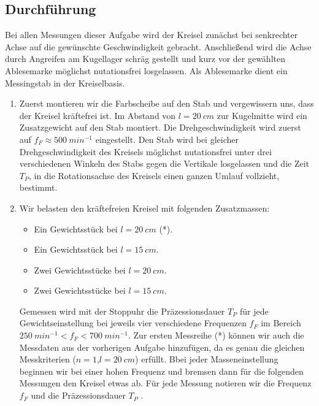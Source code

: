 \documentclass[a4paper,10pt]{article}
\begin{document}
\subsection[Durchführung]{Durchführung\fnrefb}
Bei allen Messungen dieser Aufgabe wird der Kreisel zunächst bei senkrechter  Achse auf die gewünschte Geschwindigkeit gebracht. Anschließend wird die Achse durch Angreifen am Kugellager schräg gestellt und kurz vor der
gewählten Ablesemarke möglichst nutationsfrei losgelassen. Als Ablesemarke dient ein Messingstab in der Kreiselbasis.
\begin{enumerate}[label=(\alph*)]
\item Zuerst montieren wir die Farbscheibe auf den Stab und vergewissern uns,
dass der Kreisel kräftefrei ist. Im Abstand von \(l=20\: cm\) zur Kugelmitte wird ein Zusatzgewicht auf den Stab montiert. Die Drehgeschwindigkeit wird zuerst auf \(f_F \approx 500 \: min^{-1} \) eingestellt. Den Stab wird bei gleicher Drehgeschwindigkeit des Kreisels möglichst nutationsfrei unter drei verschiedenen
Winkeln des Stabs gegen die Vertikale losgelassen und die Zeit \(T_P\), in die Rotationsachse des Kreisels einen ganzen Umlauf vollzieht,  bestimmt.

\item Wir belasten den kräftefreien Kreisel mit folgenden Zusatzmassen:
\begin{itemize}
\item Ein Gewichtsstück bei \(l=20\: cm\) (*). 
\item Ein Gewichtsstück bei \(l=15\: cm\).
\item Zwei Gewichtsstücke bei \(l=20\: cm\).
\item Zwei Gewichtsstücke bei \(l=15\: cm\). 
\end{itemize}
Gemessen wird mit der Stoppuhr die
Präzessionsdauer \(T_P\) für jede Gewichtseinstellung bei jeweils vier verschiedene Frequenzen \(f_F\) im Bereich \(250 \:{min}^{-1} < f_F < 700\:{min}^{-1}\). Zur ersten Messreihe (*) können wir auch die Messdaten aus der vorherigen Aufgabe hinzufügen, da es genau die gleichen Messkriterien  (\(n=1\),\(l=20\: cm\))  erfüllt. Bbei jeder Masseneinstellung beginnen wir bei einer hohen
Frequenz und bremsen dann für die folgenden Messungen den Kreisel etwas ab. Für jede Messung notieren wir die Frequenz \(f_F\) und die Präzessionsdauer \(T_P\) .
\end{enumerate}
\end{document}
